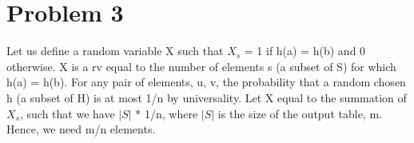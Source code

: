 \documentclass[12pt,letterpaper]{article}
\begin{document}
\section*{Problem 3}

Let us define a random variable X such that $X_{s}$ = 1 if h(a) = h(b) and 0 otherwise.
X is a rv equal to the number of elements s (a subset of S) for which h(a) = h(b).
For any pair of elements, u, v, the probability that a random chosen h (a subset of H) is at most 1/n by universality. 
Let X equal to the summation of $X_{s}$, such that we have $|S|$ * 1/n, 
where $|S|$ is the size of the output table, m. 
Hence, we need m/n elements.
\end{document}
